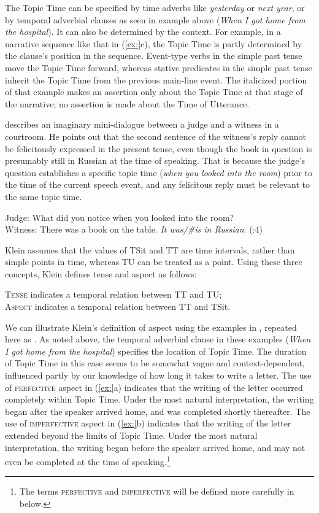 The Topic Time can be specified by time adverbs like \textit{yesterday} or \textit{next year}, or by temporal adverbial clauses as seen in example  above (\textit{When I got home from the hospital}). It can also be determined by the context. For example, in a narrative sequence like that in (\ref{ex:}c), the Topic Time is partly determined by the clause’s position in the sequence. Event-type verbs in the simple past tense move the Topic Time forward, whereas stative predicates in the simple past tense inherit the Topic Time from the previous main-line event. The italicized portion of that example makes an assertion only about the Topic Time at that stage of the narrative; no assertion is made about the Time of Utterance.



\citet[4]{Klein1994} describes an imaginary mini-dialogue between a judge and a witness in a courtroom. He points out that the second sentence of the witness’s reply cannot be felicitously expressed in the present tense, even though the book in question is presumably still in Russian at the time of speaking. That is because the judge’s question establishes a specific topic time (\textit{when you looked into the room}) prior to the time of the current speech event, and any felicitous reply must be relevant to the same topic time.


\ea
Judge: What did you notice when you looked into the room?\\
Witness: There was a book on the table. \textit{It was/\#is in Russian}.   (\citealt{Klein1994}:4)
\z


Klein assumes that the values of TSit and TT are time intervals, rather than simple points in time, whereas TU can be treated as a point. Using these three concepts, Klein defines tense and aspect as follows:


\ea
\ea \textsc{Tense} indicates a temporal relation between TT and TU;\\
\ex \textsc{Aspect} indicates a temporal relation between TT and TSit.
\z \z


We can illustrate Klein’s definition of aspect using the examples in , repeated here as . As noted above, the temporal adverbial clause in these examples (\textit{When I got home from the hospital}) specifies the location of Topic Time. The duration of Topic Time in this case seems to be somewhat vague and context-dependent, influenced partly by our knowledge of how long it takes to write a letter. The use of \textsc{perfective} aspect in (\ref{ex:}a) indicates that the writing of the letter occurred completely within Topic Time. Under the most natural interpretation, the writing began after the speaker arrived home, and was completed shortly thereafter. The use of \textsc{imperfective} aspect in (\ref{ex:}b) indicates that the writing of the letter extended beyond the limits of Topic Time. Under the most natural interpretation, the writing began before the speaker arrived home, and may not even be completed at the time of speaking.\footnote{The terms \textsc{perfective} and \textsc{imperfective} will be defined more carefully in  below.}


